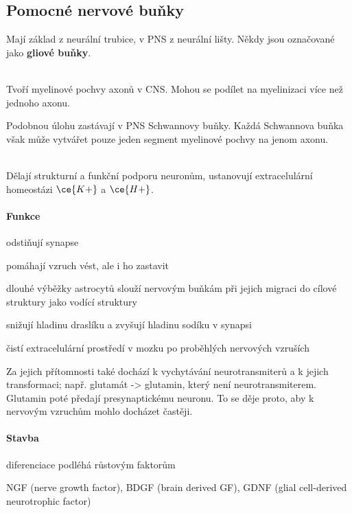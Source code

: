 \documentclass[DIV=8]{scrreprt}
\begin{document}
\subsection{Pomocné nervové buňky} \label{Pomocné nervové buňky}


Mají základ z neurální trubice, v PNS z neurální lišty. Někdy jsou označované jako \textbf{gliové buňky}.

\begin{description}
\item[oligodendrocyty]\hfill \\
Tvoří myelinové pochvy axonů v CNS. Mohou se podílet na myelinizaci více než jednoho axonu.

Podobnou úlohu zastávají v PNS Schwannovy buňky. Každá Schwannova buňka však může vytvářet pouze jeden segment myelinové pochvy na jenom axonu.


\item[astrocyty]\hfill \\
Dělají strukturní a funkční podporu neuronům, ustanovují extracelulární homeostázi \(\ce{K+}\) a \(\ce{H+}\).

\paragraph{Funkce}
\begin{myItemize}[nosep]
    \item odstiňují synapse
    \item pomáhají vzruch vést, ale i ho zastavit
    \item dlouhé výběžky astrocytů slouží nervovým buňkám při jejich migraci do cílové struktury jako vodící struktury
    \item snižují hladinu draslíku a zvyšují hladinu sodíku v synapsi
    \item čistí extracelulární prostředí v mozku po proběhlých nervových vzruších
\end{myItemize}



Za jejich přítomnosti také dochází k vychytávání neurotransmiterů a k jejich transformaci; např. glutamát -> glutamin, který není neurotransmiterem. Glutamin poté předají presynaptickému neuronu. To se děje proto, aby k nervovým vzruchům mohlo docházet častěji.

\paragraph{Stavba}
\begin{myItemize}[nosep]
    \item diferenciace podléhá růstovým faktorům
\begin{myItemize}[nosep]
    \item NGF (nerve growth factor), BDGF (brain derived GF), GDNF (glial cell-derived neurotrophic factor)
\end{myItemize}


\end{myItemize}
\end{description}
\end{document}
